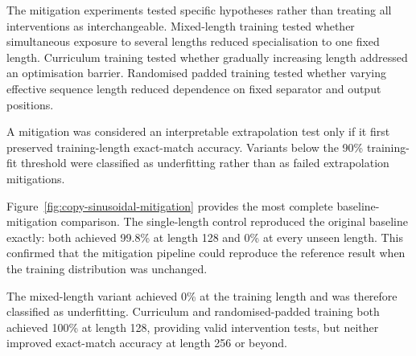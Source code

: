 \documentclass[
    author={Aanchala Ravindra Bhongade},
    supervisor={Dr. Fernando Moreno-Pino},
    degree={MSc},
    title={Length Generalisation in Transformer-Based Sequence Models: Failure Taxonomy and Mitigation Strategies},
    subtitle={},
    type={},
    year={2026}
]{dissertation}
\begin{document}
The mitigation experiments tested specific hypotheses rather than treating all interventions as interchangeable. Mixed-length training tested whether simultaneous exposure to several lengths reduced specialisation to one fixed length. Curriculum training tested whether gradually increasing length addressed an optimisation barrier. Randomised padded training tested whether varying effective sequence length reduced dependence on fixed separator and output positions.

A mitigation was considered an interpretable extrapolation test only if it first preserved training-length exact-match accuracy. Variants below the 90\% training-fit threshold were classified as underfitting rather than as failed extrapolation mitigations.

Figure~\ref{fig:copy-sinusoidal-mitigation} provides the most complete baseline-mitigation comparison. The single-length control reproduced the original baseline exactly: both achieved 99.8\% at length 128 and 0\% at every unseen length. This confirmed that the mitigation pipeline could reproduce the reference result when the training distribution was unchanged.

The mixed-length variant achieved 0\% at the training length and was therefore classified as underfitting. Curriculum and randomised-padded training both achieved 100\% at length 128, providing valid intervention tests, but neither improved exact-match accuracy at length 256 or beyond.
\end{document}
